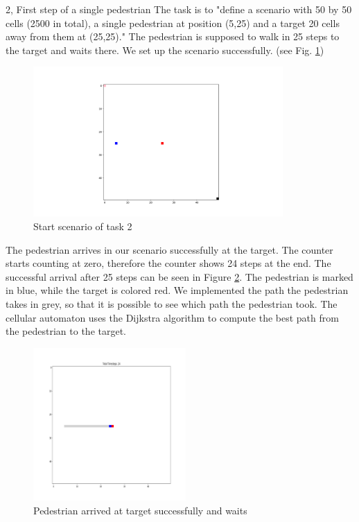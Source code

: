 \documentclass[10pt,a4paper]{article}
\begin{document}
\begin{task}{2, First step of a single pedestrian}
The task is to "define a scenario with 50 by 50 cells (2500 in total), a single pedestrian at position (5,25) and a target 20 cells away from them at (25,25)." The pedestrian is supposed to walk in 25 steps to the target and waits there. We set up the scenario successfully. (see Fig. \ref{fig:start_2})\\
\begin{figure}[H]
    \centering
    \includegraphics[width=0.85\textwidth]{pictures/2_Start.png}
    \caption{Start scenario of task 2}
    \label{fig:start_2}
\end{figure}
The pedestrian arrives in our scenario successfully at the target. The counter starts counting at zero, therefore the counter shows 24 steps at the end. The successful arrival after 25 steps can be seen in Figure \ref{fig:end_2}. The pedestrian is marked in blue, while the target is colored red. We implemented the path the pedestrian takes in grey, so that it is possible to see which path the pedestrian took. The cellular automaton uses the Dijkstra algorithm to compute the best path from the pedestrian to the target.
\begin{figure}[H]
    \centering
    \includegraphics[width=0.52\textwidth]{pictures/End.png}
    \caption{Pedestrian arrived at target successfully and waits}
    \label{fig:end_2}
\end{figure}
\end{task}
\end{document}
